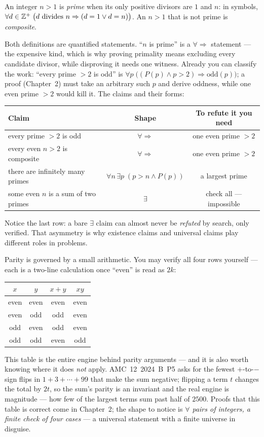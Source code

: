 \begin{definition}[Prime]
An integer $n>1$ is \emph{prime} when its only positive divisors are $1$ and $n$:
in symbols, $\forall d\in\mathbb{Z}^{+}\;\bigl(d \text{ divides } n \Rightarrow
(d=1 \lor d=n)\bigr)$. An $n>1$ that is not prime is \emph{composite}.
\end{definition}

Both definitions are quantified statements. ``$n$ is prime'' is a
$\forall\Rightarrow$ statement --- the expensive kind, which is why proving primality
means excluding every candidate divisor, while disproving it needs one witness.
Already you can classify the work: ``every prime $>2$ is odd'' is
$\forall p\;\bigl((P(p)\land p>2)\Rightarrow \text{odd}(p)\bigr)$; a proof (Chapter~2)
must take an arbitrary such $p$ and derive oddness, while one even prime $>2$ would
kill it. The claims and their forms:
\begin{center}
\begin{tabular}{lcc}
\toprule
Claim & Shape & To refute it you need\\
\midrule
every prime $>2$ is odd & $\forall\Rightarrow$ & one even prime $>2$\\
every even $n>2$ is composite & $\forall\Rightarrow$ & one even prime $>2$\\
there are infinitely many primes & $\forall n\,\exists p\;(p>n \land P(p))$ & a largest prime\\
some even $n$ is a sum of two primes & $\exists$ & check all --- impossible\\
\bottomrule
\end{tabular}
\end{center}
Notice the last row: a bare $\exists$ claim can almost never be \emph{refuted} by
search, only verified. That asymmetry is why existence claims and universal claims
play different roles in problems.

Parity is governed by a small arithmetic. You may verify all four rows yourself ---
each is a two-line calculation once ``even'' is read as $2k$:
\begin{center}
\begin{tabular}{cc|cc}
\toprule
$x$ & $y$ & $x+y$ & $xy$\\
\midrule
even & even & even & even\\
even & odd & odd & even\\
odd & even & odd & even\\
odd & odd & even & odd\\
\bottomrule
\end{tabular}
\end{center}
This table is the entire engine behind parity arguments --- and it is also worth
knowing where it does \emph{not} apply. AMC~12~2024~B~P5 asks for the fewest
$+$-to-$-$ sign flips in $1+3+\cdots+99$ that make the sum negative; flipping a
term $t$ changes the total by $2t$, so the sum's parity is an invariant and the
real engine is magnitude --- how few of the largest terms sum past half of
$2500$. Proofs that this table is correct come in Chapter~2; the shape to
notice is \emph{$\forall$ pairs of integers, a finite check of four cases} ---
a universal statement with a finite universe in disguise.

